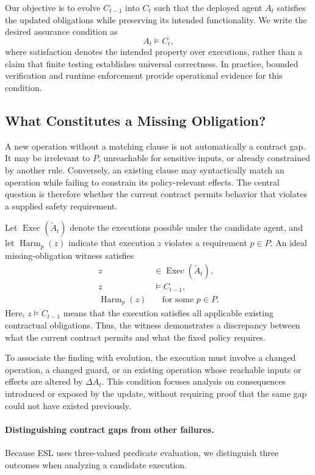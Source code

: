 Our objective is to evolve $C_{t-1}$ into $C_t$ such that the
deployed agent $A_t$ satisfies the updated obligations while
preserving its intended functionality. We write the desired
assurance condition as
\[
A_t\models C_t,
\]
where satisfaction denotes the intended property over executions,
rather than a claim that finite testing establishes universal
correctness. In practice, bounded verification and runtime
enforcement provide operational evidence for this condition.

\subsection{What Constitutes a Missing Obligation?}

A new operation without a matching clause is not automatically
a contract gap. It may be irrelevant to $P$, unreachable for
sensitive inputs, or already constrained by another rule.
Conversely, an existing clause may syntactically match an
operation while failing to constrain its policy-relevant effects.
The central question is therefore whether the current contract
permits behavior that violates a supplied safety requirement.

Let $\operatorname{Exec}(\widetilde A_t)$ denote the executions
possible under the candidate agent, and let
$\operatorname{Harm}_p(z)$ indicate that execution $z$ violates
a requirement $p\in P$. An ideal missing-obligation witness
satisfies
\[
\begin{aligned}
z &\in \operatorname{Exec}(\widetilde A_t),\\
z &\models C_{t-1},\\
\operatorname{Harm}_p(z) &\quad\text{for some }p\in P.
\end{aligned}
\]
Here, $z\models C_{t-1}$ means that the execution satisfies
all applicable existing contractual obligations. Thus, the
witness demonstrates a discrepancy between what the current
contract permits and what the fixed policy requires.

To associate the finding with evolution, the execution must
involve a changed operation, a changed guard, or an existing
operation whose reachable inputs or effects are altered by
$\Delta A_t$. This condition focuses analysis on consequences
introduced or exposed by the update, without requiring proof
that the same gap could not have existed previously.

\paragraph{Distinguishing contract gaps from other failures.}
Because ESL uses three-valued predicate evaluation, we distinguish
three outcomes when analyzing a candidate execution.

